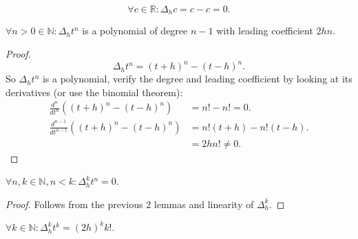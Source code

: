 \documentclass[a4paper,12pt]{article}
\begin{document}
\begin{lemma}[$\Delta c$]
    \begin{equation}
        \forall c \in \mathbb{R}: \Delta_{h} c =c-c = 0
        .
    \end{equation}
\end{lemma}


\begin{lemma}[$\Delta_{h} t^{n}$]
    $\forall n>0 \in \mathbb{N}: \Delta_{h} t^{n}$ is a polynomial of degree $n-1$
    with leading coefficient $2hn$.
\end{lemma}

\begin{proof}
    \begin{equation}
        \Delta_{h} t^{n} = (t+h) ^{n}- (t-h) ^{n}  .
    \end{equation}
    So $\Delta_{h} t^{n}$  is a polynomial, verify the degree and leading coefficient by looking at its derivatives
    (or use the binomial theorem):
    \begin{align}
        \frac{d^{n}}{dt^{n}}\left((t+h) ^{n}- (t-h) ^{n} \right)     & = n! -n! =0.         \\
        \frac{d^{n-1}}{dt^{n-1}}\left((t+h) ^{n}- (t-h) ^{n} \right) & = n!(t+h) - n!(t-h). \\
                                                                     & = 2h n! \neq 0.
    \end{align}

\end{proof}

\begin{lemma}[$\Delta^{k}_{h} t^{n}$]
    $\forall n,k \in \mathbb{N}, n<k: \Delta^{k}_{h} t^{n} = 0$.
\end{lemma}

\begin{proof}
    Follows from the previous $2$ lemmas and linearity of $\Delta^{k}_{h}$.
\end{proof}

\begin{lemma}[$\Delta^{k}_{h} t^{k}$]
    $\forall k \in \mathbb{N}: \Delta^{k}_{h} t^{k} = (2h)^{k} k!$.
\end{lemma}
\end{document}
